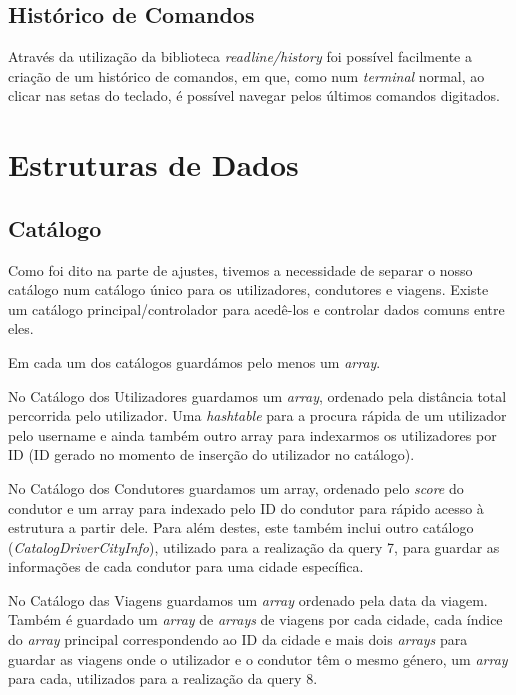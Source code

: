 \documentclass{article}
\begin{document}
        \subsection{Histórico de Comandos}
            Através da utilização da biblioteca \emph{readline/history} foi possível
            facilmente a criação de um histórico de comandos, em que, como num \textit{terminal}
            normal, ao clicar nas setas do teclado, é possível navegar pelos últimos
            comandos digitados.
            
    \section{Estruturas de Dados}
        \subsection{Catálogo}
            Como foi dito na parte de ajustes, tivemos a necessidade de separar o nosso
            catálogo num catálogo único para os utilizadores, condutores e viagens.
            Existe um catálogo principal/controlador para acedê-los e controlar dados comuns entre eles.

            Em cada um dos catálogos guardámos pelo menos um \textit{array}.
            
            No Catálogo dos Utilizadores guardamos um \textit{array}, ordenado pela distância total percorrida
            pelo utilizador. Uma \textit{hashtable} para a procura rápida de um utilizador pelo username e
            ainda também outro array para indexarmos os utilizadores por ID (ID gerado no
            momento de inserção do utilizador no catálogo).
			
            No Catálogo dos Condutores guardamos um array, ordenado pelo \emph{score} do condutor e
            um array para indexado pelo ID do condutor para rápido acesso à estrutura a partir dele.
            Para além destes, este também inclui outro catálogo (\textit{CatalogDriverCityInfo}), utilizado para a realização da query 7, 
            para guardar as informações de cada condutor para uma cidade 
            específica.
			
            No Catálogo das Viagens guardamos um \textit{array} ordenado pela data da viagem. 
            Também é guardado um \textit{array} de \textit{arrays} de viagens por cada cidade, cada índice
            do \textit{array} principal correspondendo ao ID da cidade e mais dois \textit{arrays} para guardar
            as viagens onde o utilizador e o condutor têm o mesmo género, um \textit{array} para cada,
            utilizados para a realização da query 8.
\end{document}
